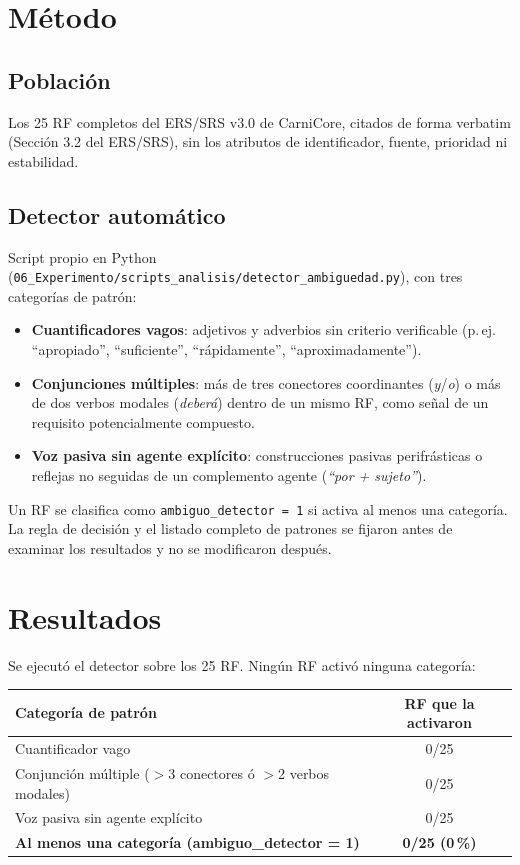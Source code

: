 \documentclass[11pt,a4paper]{article}
\newcommand{\br}{\discretionary{}{}{}}
\begin{document}
\section{M\'etodo}

\subsection{Poblaci\'on}
Los 25 RF completos del ERS/SRS v3.0 de CarniCore, citados de forma verbatim (Secci\'on 3.2 del ERS/SRS), sin los atributos de identificador, fuente, prioridad ni estabilidad.

\subsection{Detector autom\'atico}
Script propio en Python (\texttt{06\_\br Experimento/\br scripts\_\br analisis/\br detector\_\br ambiguedad.py}), con tres categor\'ias de patr\'on:
\begin{itemize}[leftmargin=*]
\item \textbf{Cuantificadores vagos}: adjetivos y adverbios sin criterio verificable (p.\,ej. ``apropiado'', ``suficiente'', ``r\'apidamente'', ``aproximadamente'').
\item \textbf{Conjunciones m\'ultiples}: m\'as de tres conectores coordinantes (\emph{y}/\emph{o}) o m\'as de dos verbos modales (\emph{deber\'a}) dentro de un mismo RF, como se\~nal de un requisito potencialmente compuesto.
\item \textbf{Voz pasiva sin agente expl\'icito}: construcciones pasivas perifr\'asticas o reflejas no seguidas de un complemento agente (\emph{``por + sujeto''}).
\end{itemize}
Un RF se clasifica como \texttt{ambiguo\_detector = 1} si activa al menos una categor\'ia. La regla de decisi\'on y el listado completo de patrones se fijaron antes de examinar los resultados y no se modificaron despu\'es.

\section{Resultados}

Se ejecut\'o el detector sobre los 25 RF. Ning\'un RF activ\'o ninguna categor\'ia:

\begin{center}
\begin{tabular}{@{}lc@{}}
\toprule
Categor\'ia de patr\'on & RF que la activaron \\
\midrule
Cuantificador vago & 0/25 \\
Conjunci\'on m\'ultiple ($>$3 conectores \'o $>$2 verbos modales) & 0/25 \\
Voz pasiva sin agente expl\'icito & 0/25 \\
\midrule
\textbf{Al menos una categor\'ia (ambiguo\_detector = 1)} & \textbf{0/25 (0\,\%)} \\
\bottomrule
\end{tabular}
\end{center}
\end{document}

